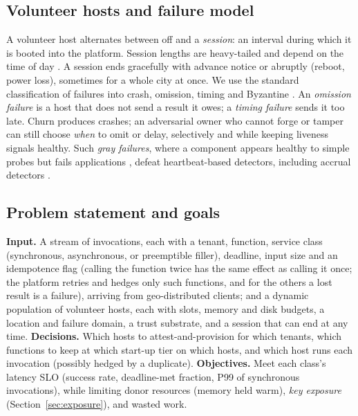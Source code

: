 \subsection{Volunteer hosts and failure model}
A volunteer host alternates between off and a \emph{session}: an interval during which it is booted into the platform. Session
lengths are heavy-tailed and depend on the time of day \cite{javadi2013fta}. A session ends gracefully with advance notice or
abruptly (reboot, power loss), sometimes for a whole city at once. We use the standard classification of failures into
crash, omission, timing and Byzantine \cite{cristian1991understanding,avizienis2004basic}. An \emph{omission failure}
is a host that does not send a result it owes; a \emph{timing failure} sends it too late. Churn produces crashes; an adversarial owner who
cannot forge or tamper can still choose \emph{when} to omit or delay, selectively and while keeping liveness signals
healthy. Such \emph{gray failures}, where a component appears healthy to simple probes but fails applications
\cite{huang2017gray}, defeat heartbeat-based detectors, including accrual detectors \cite{hayashibara2004phi}.

\subsection{Problem statement and goals}
\textbf{Input.} A stream of invocations, each with a tenant, function, service class (synchronous, asynchronous, or
preemptible filler), deadline, input size and an idempotence flag (calling the function twice has the same effect as calling it once; the platform retries and hedges only such functions, and for the others a lost result is a failure), arriving from geo-distributed clients; and a dynamic population
of volunteer hosts, each with slots, memory and disk budgets, a location and failure domain, a trust substrate, and a
session that can end at any time. \textbf{Decisions.} Which hosts to attest-and-provision for which tenants, which functions to keep at
which start-up tier on which hosts, and which host runs each invocation (possibly hedged by a duplicate).
\textbf{Objectives.} Meet each class's latency SLO (success rate, deadline-met fraction, P99 of synchronous invocations),
while limiting donor resources (memory held warm), \emph{key exposure} (Section~\ref{sec:exposure}), and wasted work.

